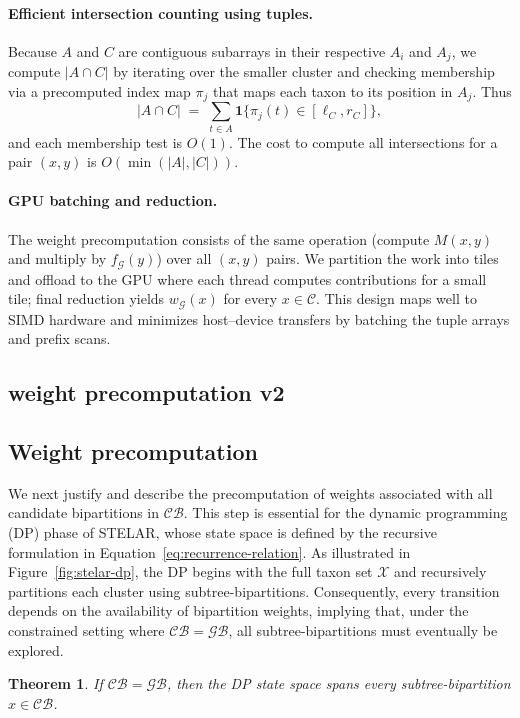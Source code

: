 \documentclass[10pt,a4paper]{article}
\newtheorem{theorem}{Theorem}[section]
\begin{document}
\begin{enumerate}
\paragraph{Efficient intersection counting using tuples.} Because $A$ and $C$ are contiguous subarrays in their respective $A_i$ and $A_j$, we compute $|A\cap C|$ by iterating over the smaller cluster and checking membership via a precomputed index map $\pi_j$ that maps each taxon to its position in $A_j$. Thus
\[
|A\cap C| \;=\; \sum_{t\in A} \mathbf{1}\{ \pi_j(t)\in [\ell_C,r_C]\},
\]
and each membership test is $O(1)$. The cost to compute all intersections for a pair $(x,y)$ is $O(\min(|A|,|C|))$.

\paragraph{GPU batching and reduction.} The weight precomputation consists of the same operation (compute $M(x,y)$ and multiply by $f_{\mathcal{G}}(y)$) over all $(x,y)$ pairs. We partition the work into tiles and offload to the GPU where each thread computes contributions for a small tile; final reduction yields $w_{\mathcal{G}}(x)$ for every $x\in\mathcal{C}$. This design maps well to SIMD hardware and minimizes host–device transfers by batching the tuple arrays and prefix scans.

\subsection{weight precomputation v2}

\subsection*{Weight precomputation}

We next justify and describe the precomputation of weights associated with all candidate bipartitions in $\mathcal{CB}$. This step is essential for the dynamic programming (DP) phase of STELAR, whose state space is defined by the recursive formulation in Equation~\eqref{eq:recurrence-relation}. As illustrated in Figure~\ref{fig:stelar-dp}, the DP begins with the full taxon set $\mathcal{X}$ and recursively partitions each cluster using subtree-bipartitions. Consequently, every transition depends on the availability of bipartition weights, implying that, under the constrained setting where $\mathcal{CB} = \mathcal{GB}$, all subtree-bipartitions must eventually be explored.

\begin{theorem}
\label{th:dp-span}
If $\mathcal{CB} = \mathcal{GB}$, then the DP state space spans every subtree-bipartition $x \in \mathcal{CB}$.
\end{theorem}


\end{enumerate}
\end{document}
